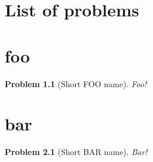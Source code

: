 \documentclass{book}
\theoremstyle{problem}
\newtheorem{Problem}{Problem}[chapter]
\begin{document}
\chapter*{List of problems}

\chapter{foo}

\begin{Problem}[Short FOO name]
  Foo!
\end{Problem}

\chapter{bar}

\begin{Problem}[Short BAR name]
  Bar!
\end{Problem}
\end{document}

